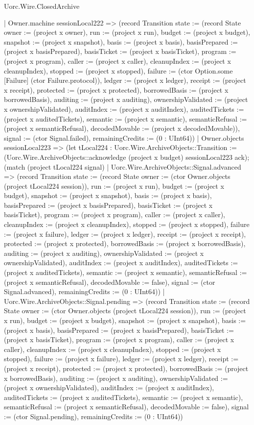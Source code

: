 \begin{lexlean}{Uorc.Wire.ClosedArchive}
\begin{semanticmodule}
{    | Owner.machine sessionLocal222 => (record Transition {state := (record State {owner := (project x owner), run := (project x run), budget := (project x budget), snapshot := (project x snapshot), basis := (project x basis), basisPrepared := (project x basisPrepared), basisTicket := (project x basisTicket), program := (project x program), caller := (project x caller), cleanupIndex := (project x cleanupIndex), stopped := (project x stopped), failure := (ctor Option.some [Failure] (ctor Failure.protocol)), ledger := (project x ledger), receipt := (project x receipt), protected := (project x protected), borrowedBasis := (project x borrowedBasis), auditing := (project x auditing), ownershipValidated := (project x ownershipValidated), auditIndex := (project x auditIndex), auditedTickets := (project x auditedTickets), semantic := (project x semantic), semanticRefusal := (project x semanticRefusal), decodedMovable := (project x decodedMovable)}), signal := (ctor Signal.failed), remainingCredits := (0 : UInt64)})
    | Owner.objects sessionLocal223 => (let tLocal224 : Uorc.Wire.ArchiveObjects::Transition := (Uorc.Wire.ArchiveObjects::acknowledge (project x budget) sessionLocal223 ack); (match (project tLocal224 signal)
      | Uorc.Wire.ArchiveObjects::Signal.advanced => (record Transition {state := (record State {owner := (ctor Owner.objects (project tLocal224 session)), run := (project x run), budget := (project x budget), snapshot := (project x snapshot), basis := (project x basis), basisPrepared := (project x basisPrepared), basisTicket := (project x basisTicket), program := (project x program), caller := (project x caller), cleanupIndex := (project x cleanupIndex), stopped := (project x stopped), failure := (project x failure), ledger := (project x ledger), receipt := (project x receipt), protected := (project x protected), borrowedBasis := (project x borrowedBasis), auditing := (project x auditing), ownershipValidated := (project x ownershipValidated), auditIndex := (project x auditIndex), auditedTickets := (project x auditedTickets), semantic := (project x semantic), semanticRefusal := (project x semanticRefusal), decodedMovable := false}), signal := (ctor Signal.advanced), remainingCredits := (0 : UInt64)})
      | Uorc.Wire.ArchiveObjects::Signal.pending => (record Transition {state := (record State {owner := (ctor Owner.objects (project tLocal224 session)), run := (project x run), budget := (project x budget), snapshot := (project x snapshot), basis := (project x basis), basisPrepared := (project x basisPrepared), basisTicket := (project x basisTicket), program := (project x program), caller := (project x caller), cleanupIndex := (project x cleanupIndex), stopped := (project x stopped), failure := (project x failure), ledger := (project x ledger), receipt := (project x receipt), protected := (project x protected), borrowedBasis := (project x borrowedBasis), auditing := (project x auditing), ownershipValidated := (project x ownershipValidated), auditIndex := (project x auditIndex), auditedTickets := (project x auditedTickets), semantic := (project x semantic), semanticRefusal := (project x semanticRefusal), decodedMovable := false}), signal := (ctor Signal.pending), remainingCredits := (0 : UInt64)})
}
\end{semanticmodule}
\end{lexlean}

